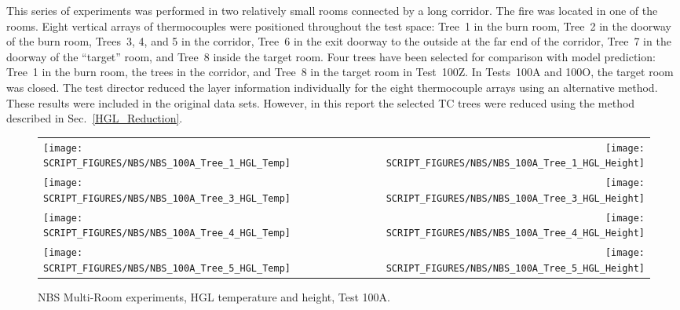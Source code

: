 This series of experiments was performed in two relatively small rooms connected by a long corridor. The fire was located in one of the rooms.  Eight vertical arrays of thermocouples were positioned throughout the test space: Tree~1 in the burn room, Tree~2 in the doorway of the burn room, Trees~3, 4, and 5 in the corridor, Tree~6 in the exit doorway to the outside at the far end of the corridor, Tree~7 in the doorway of the ``target'' room, and Tree~8 inside the target room.  Four trees have been selected for comparison with model prediction: Tree~1 in the burn room, the trees in the corridor, and Tree~8 in the target room in Test~100Z. In Tests~100A and 100O, the target room was closed. The test director reduced the layer information individually for the eight thermocouple arrays using an alternative method. These results were included in the original data sets. However, in this report the selected TC trees were reduced using the method described in Sec.~\ref{HGL_Reduction}.

\newpage

\begin{figure}[p]
\begin{tabular*}{\textwidth}{l@{\extracolsep{\fill}}r}
\texttt{[image: SCRIPT\_FIGURES/NBS/NBS\_100A\_Tree\_1\_HGL\_Temp]} &
\texttt{[image: SCRIPT\_FIGURES/NBS/NBS\_100A\_Tree\_1\_HGL\_Height]} \\
\texttt{[image: SCRIPT\_FIGURES/NBS/NBS\_100A\_Tree\_3\_HGL\_Temp]} &
\texttt{[image: SCRIPT\_FIGURES/NBS/NBS\_100A\_Tree\_3\_HGL\_Height]} \\
\texttt{[image: SCRIPT\_FIGURES/NBS/NBS\_100A\_Tree\_4\_HGL\_Temp]} &
\texttt{[image: SCRIPT\_FIGURES/NBS/NBS\_100A\_Tree\_4\_HGL\_Height]} \\
\texttt{[image: SCRIPT\_FIGURES/NBS/NBS\_100A\_Tree\_5\_HGL\_Temp]} &
\texttt{[image: SCRIPT\_FIGURES/NBS/NBS\_100A\_Tree\_5\_HGL\_Height]}
\end{tabular*}
\caption[NBS Multi-Room experiments, HGL temperature and height, Test 100A]
{NBS Multi-Room experiments, HGL temperature and height, Test 100A.}
\label{NBS_HGL_1}
\end{figure}


